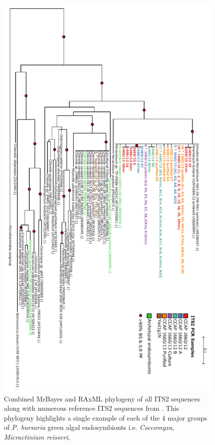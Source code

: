\begin{figure}
    \centering
    \includegraphics[height=0.8\textheight]{its_phylo.pdf}
    \caption[ITS2 phylogeny]{Combined MrBayes and RAxML phylogeny of all ITS2 sequences
    along with numerous reference ITS2 sequences from \citep{Hoshina2010,Hoshina2013}.
    This phylogeny highlights a single example of each of the 4 major groups of 
    \textit{P. bursaria} green algal endosymbionts i.e. \textit{Coccomyxa}, \textit{Micractinium reisseri},
}
\end{figure}
